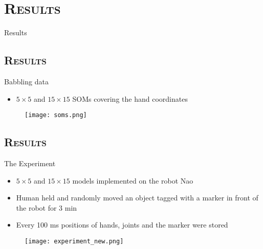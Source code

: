 \documentclass[xcolor=x11names,dvipsnames,compress]{beamer}
\renewcommand{\(}{\begin{columns}}
\renewcommand{\)}{\end{columns}}
\newcommand{\<}[1]{\begin{column}{#1}}
\renewcommand{\>}{\end{column}}
\begin{document}
\section{\scshape Results}
\begin{frame}[noframenumbering]
\Large Results
\end{frame}


\subsection{\scshape Results}
\begin{frame}{Babbling data}
\begin{itemize}
 \item $5\times5$ and $15\times15$ SOMs covering the hand coordinates
\end{itemize}

\begin{figure}
\texttt{[image: soms.png]} 
\end{figure}

\end{frame}



\subsection{\scshape Results}
\begin{frame}{The Experiment}
\begin{itemize}
	\item $5\times5$ and $15\times15$ models implemented on the robot Nao
	\item Human held and randomly moved an object tagged with a marker in front of the robot for 3 min
	\item Every 100 ms positions of hands, joints and the marker were stored	
\end{itemize}
      \begin{figure}      
      \texttt{[image: experiment\_new.png]}          
      \end{figure}
 
\end{frame}

\end{document}
